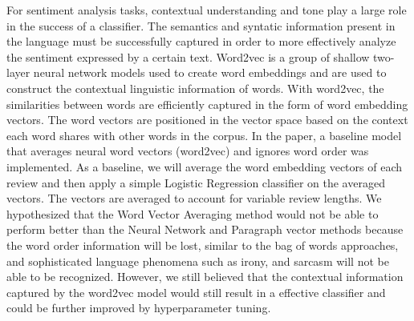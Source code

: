 \documentclass[conference]{IEEEtran}
\begin{document}
For sentiment analysis tasks, contextual understanding and tone play a large role in the success of a classifier. The semantics and syntatic information present in the language must be successfully captured in order to more effectively analyze the sentiment expressed by a certain text. Word2vec is a group of shallow two-layer neural network models used to create word embeddings and are used to construct the contextual linguistic information of words. With word2vec, the similarities between words are efficiently captured in the form of word embedding vectors.  The word vectors are positioned in the vector space based on the context each word shares with other words in the corpus. In the paper, a baseline model that averages neural word vectors (word2vec) and ignores word order was implemented. As a baseline, we will average the word embedding vectors of each review and then apply a simple Logistic Regression classifier on the averaged vectors. The vectors are averaged to account for variable review lengths. We hypothesized that the Word Vector Averaging method would not be able to perform better than the Neural Network and Paragraph vector methods because the word order information will be lost, similar to the bag of words approaches, and sophisticated language phenomena such as irony, and sarcasm will not be able to be recognized. However, we still believed that the contextual information captured by the word2vec model would still result in a effective classifier and could be further improved by hyperparameter tuning.
\end{document}

